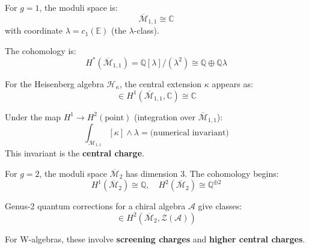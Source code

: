 \begin{example}
\label{ex:genus-1-obstruction-complete}
For $g=1$, the moduli space is:
\begin{equation}
\overline{\mathcal{M}}_{1,1} \cong \mathbb{C}
\end{equation}
with coordinate $\lambda = c_1(\mathbb{E})$ (the $\lambda$-class).

The cohomology is:
\begin{equation}
H^*(\overline{\mathcal{M}}_{1,1}) = \mathbb{Q}[\lambda] / (\lambda^2) \cong \mathbb{Q} \oplus \mathbb{Q}\lambda
\end{equation}

For the Heisenberg algebra $\mathcal{H}_\kappa$, the central extension $\kappa$ appears as:
\begin{equation}
[\kappa] \in H^1(\overline{\mathcal{M}}_{1,1}, \mathbb{C}) \cong \mathbb{C}
\end{equation}

Under the map $H^1 \to H^2(\text{point})$ (integration over $\overline{\mathcal{M}}_{1,1}$):
\begin{equation}
\int_{\overline{\mathcal{M}}_{1,1}} [\kappa] \wedge \lambda = \text{(numerical invariant)}
\end{equation}
This invariant is the \textbf{central charge}.
\end{example}

\begin{example}
\label{ex:genus-2-obstruction}
For $g=2$, the moduli space $\overline{\mathcal{M}}_2$ has dimension 3. The cohomology begins:
\begin{equation}
H^1(\overline{\mathcal{M}}_2) \cong \mathbb{Q}, \quad H^2(\overline{\mathcal{M}}_2) \cong \mathbb{Q}^{\oplus 2}
\end{equation}

Genus-2 quantum corrections for a chiral algebra $\mathcal{A}$ give classes:
\begin{equation}
[c_2] \in H^2(\overline{\mathcal{M}}_2, \mathcal{Z}(\mathcal{A}))
\end{equation}

For W-algebras, these involve \textbf{screening charges} and \textbf{higher central charges}.
\end{example}


